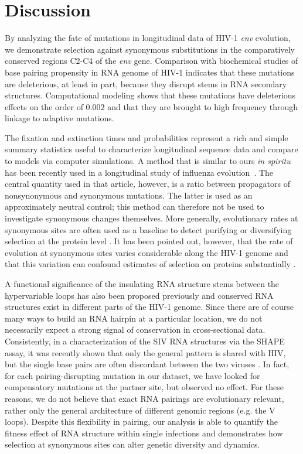\documentclass[rmp, twocolumn]{revtex4}
\newcommand{\env}{\textit{env}}
\begin{document}
\section{Discussion}
By analyzing the fate of mutations in longitudinal data of HIV-1 \env{} evolution,
we demonstrate selection against synonymous substitutions in the comparatively
conserved regions C2-C4 of the \env{} gene. Comparison with biochemical studies
of base pairing propensity in RNA genome of HIV-1 indicates that these
mutations are deleterious, at least in part, because they disrupt stems in RNA
secondary structures. Computational modeling shows that these mutations have
deleterious effects on the order of $0.002$ and that they are brought to high
frequency through linkage to adaptive mutations.

The fixation and extinction times and probabilities represent a rich and simple
summary statistics useful to characterize longitudinal sequence data and compare
to models via computer simulations. A method that is similar to ours {\it in
spiritu} has been recently used in a longitudinal study of influenza
evolution~\citep{strelkowa_clonal_2012}. The central quantity used in that
article, however, is a ratio between propagators of nonsynonymous and synonymous
mutations. The latter is used as an approximately neutral control; this method
can therefore not be used to investigate synonymous changes themselves. More
generally, evolutionary rates at synonymous sites are often used as a baseline
to detect purifying or diversifying selection at the protein level
\cite{Hurst:2002p32608}. It has been pointed out, however, that the rate of
evolution at synonymous sites varies considerable along the HIV-1 genome
\citep{mayrose_towards_2007} and that this variation can confound estimates of
selection on proteins substantially \citep{ngandu_extensive_2008}.

A functional significance of the insulating RNA structure stems between the
hypervariable loops has also been proposed previously
\citep{watts_architecture_2009, sanjuan_interplay_2011} and conserved RNA
structures exist in different parts of the HIV-1 genome. Since there are of
course many ways to build an RNA hairpin at a particular location, we do not
necessarily expect a strong signal of conservation in cross-sectional data.
Consistently, in a characterization of the SIV RNA structures via the SHAPE
assay, it was recently shown that only the general pattern is shared with HIV,
but the single base pairs are often discordant between the two viruses
\citep{pollom_comparison_2013}. In fact, for each pairing-disrupting mutation in
our dataset, we have looked for compensatory mutations at the partner site, but
observed no effect. For these reasons, we do not believe that exact RNA pairings
are evolutionary relevant, rather only the general architecture of different
genomic regions (e.g. the V loops). Despite this flexibility in pairing, our
analysis is able to quantify the fitness effect of RNA structure within single
infections and demonstrates how selection at synonymous sites can alter genetic
diversity and dynamics.
\end{document}
